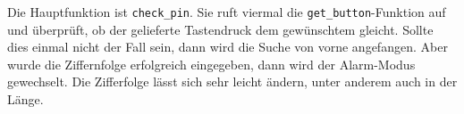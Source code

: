 Die Hauptfunktion ist \texttt{check\_pin}. Sie ruft viermal die
\texttt{get\_button}-Funktion auf und überprüft, ob der gelieferte
Tastendruck dem gewünschtem gleicht. Sollte dies einmal nicht der Fall
sein, dann wird die Suche von vorne angefangen. Aber wurde die
Ziffernfolge erfolgreich eingegeben, dann wird der Alarm-Modus
gewechselt. Die Zifferfolge lässt sich sehr leicht ändern, unter anderem
auch in der Länge.
